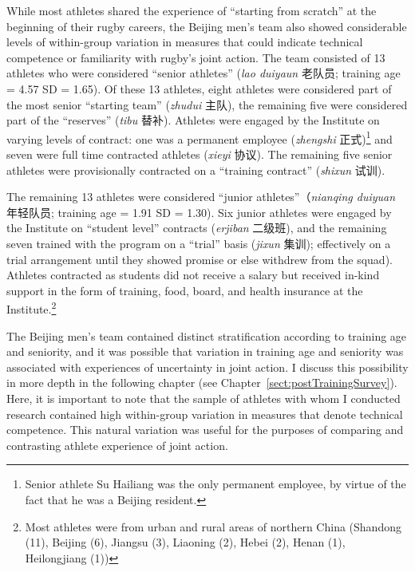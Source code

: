 \begin{CJK}{UTF8}{gbsn}
While most athletes shared the experience of ``starting from scratch'' at the beginning of their rugby careers, the Beijing men's team also showed considerable levels of within-group variation in measures that could indicate technical competence or familiarity with rugby's joint action.  The team consisted of 13 athletes who were considered ``senior athletes'' (\textit{lao duiyaun} 老队员; training age = 4.57 SD = 1.65).  Of these 13 athletes, eight athletes were considered part of the most senior ``starting team'' (\textit{zhudui} 主队), the remaining five were considered part of the ``reserves'' (\textit{tibu} 替补).  Athletes were engaged by the Institute on varying levels of contract: one was a permanent employee (\textit{zhengshi} 正式)\footnote{Senior athlete Su Hailiang was the only permanent employee, by virtue of the fact that he was a Beijing resident.} and seven were full time contracted athletes (\textit{xieyi} 协议).  The remaining five senior athletes were provisionally contracted on a ``training contract'' (\textit{shixun} 试训).

The remaining 13 athletes were considered ``junior athletes''（\textit{nianqing duiyuan} 年轻队员; training age = 1.91 SD = 1.30).
Six junior athletes were engaged by the Institute on ``student level'' contracts (\textit{erjiban} 二级班), and the remaining seven trained with the program on a ``trial'' basis (\textit{jixun} 集训); effectively on a trial arrangement until they showed promise or else withdrew from the squad).  Athletes contracted as students did not receive a salary but received in-kind support in the form of training, food, board, and health insurance at the Institute.\footnote{Most athletes were from urban and rural areas of northern China (Shandong (11), Beijing (6), Jiangsu (3), Liaoning (2), Hebei (2), Henan (1), Heilongjiang (1))}

The Beijing men's team contained distinct stratification according to training age and seniority, and it was possible that variation in training age and seniority was associated with experiences of uncertainty in joint action.  I discuss this possibility in more depth in the following chapter (see Chapter~\ref{sect:postTrainingSurvey}).  Here, it is important to note that the sample of athletes with whom I conducted research contained high within-group variation in measures that denote technical competence.  This natural variation was useful for the purposes of comparing and contrasting athlete experience of joint action.



\end{CJK}
